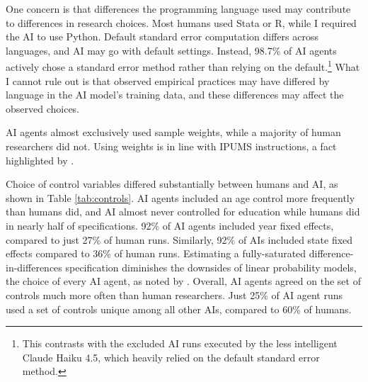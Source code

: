 \documentclass[
  12pt]{article}
\begin{document}
One concern is that differences the programming language used may
contribute to differences in research choices. Most humans used Stata or
R, while I required the AI to use Python. Default standard error
computation differs across languages, and AI may go with default
settings. Instead, 98.7\% of AI agents actively chose a standard error
method rather than relying on the
default.\footnote{This contrasts with the excluded AI runs executed by the less intelligent Claude Haiku 4.5, which heavily relied on the default standard error method.}
What I cannot rule out is that observed empirical practices may have
differed by language in the AI model's training data, and these
differences may affect the observed choices.

AI agents almost exclusively used sample weights, while a majority of
human researchers did not. Using weights is in line with IPUMS
instructions, a fact highlighted by \citet{huntingtonklein2025sources}.

Choice of control variables differed substantially between humans and
AI, as shown in Table \ref{tab:controls}. AI agents included an age
control more frequently than humans did, and AI almost never controlled
for education while humans did in nearly half of specifications. 92\% of
AI agents included year fixed effects, compared to just 27\% of human
runs. Similarly, 92\% of AIs included state fixed effects compared to
36\% of human runs. Estimating a fully-saturated
difference-in-differences specification diminishes the downsides of
linear probability models, the choice of every AI agent, as noted by
\citet{huntingtonklein2025sources}. Overall, AI agents agreed on the set
of controls much more often than human researchers. Just 25\% of AI
agent runs used a set of controls unique among all other AIs, compared
to 60\% of humans.

\begin{table}[!htbp]
\centering
\caption{Control variable choices by researcher type}
\label{tab:controls}
\small
\resizebox{\textwidth}{!}{}
\caption*{\footnotesize \textbf{Notes:} The table presents the number and share of AI and human estimation specifications that included various controls. Human results use Task 1 submissions from Table 6 of \citet{huntingtonklein2025sources}. Each block reports how runs restricted the variable named in its heading; categories within a block are mutually exclusive and sum to the block total. "All" columns report restrictions on the estimation sample, "Treated" columns the restrictions used to code DACA eligibility, which inherit those used to restrict the whole sample. YRSUSA is the IPUMS years-in-the-US variable.}
\end{table}
\FloatBarrier
\end{document}

